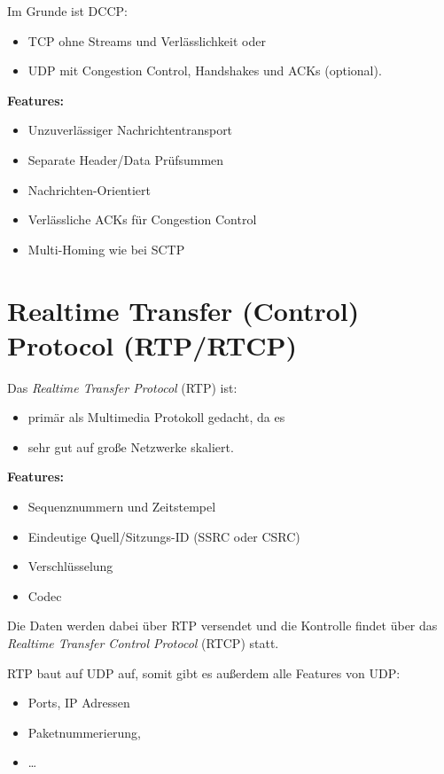 \documentclass[a4paper, 11pt, accentcolor = tud3b]{tudreport}
\begin{document}
            Im Grunde ist DCCP:
            \begin{itemize}
            	\item TCP ohne Streams und Verlässlichkeit oder
            	\item UDP mit Congestion Control, Handshakes und ACKs (optional).
            \end{itemize}
            
            \textbf{Features:}
            \begin{itemize}
            	\item Unzuverlässiger Nachrichtentransport
            	\item Separate Header/Data Prüfsummen
            	\item Nachrichten-Orientiert
            	\item Verlässliche ACKs für Congestion Control
            	\item Multi-Homing wie bei SCTP
            \end{itemize}

        \section{Realtime Transfer (Control) Protocol (RTP/RTCP)}
            Das \textit{Realtime Transfer Protocol} (RTP) ist:
            \begin{itemize}
            	\item primär als Multimedia Protokoll gedacht, da es
            	\item sehr gut auf große Netzwerke skaliert.
            \end{itemize}
            
            \textbf{Features:}
            \begin{itemize}
            	\item Sequenznummern und Zeitstempel
            	\item Eindeutige Quell/Sitzungs-ID (SSRC oder CSRC)
            	\item Verschlüsselung
            	\item Codec
            \end{itemize}
            
            Die Daten werden dabei über RTP versendet und die Kontrolle findet über das \textit{Realtime Transfer Control Protocol} (RTCP) statt.
            
            RTP baut auf UDP auf, somit gibt es außerdem alle Features von UDP:
            \begin{itemize}
            	\item Ports, IP Adressen
            	\item Paketnummerierung,
            	\item \dots
            \end{itemize}
\end{document}
